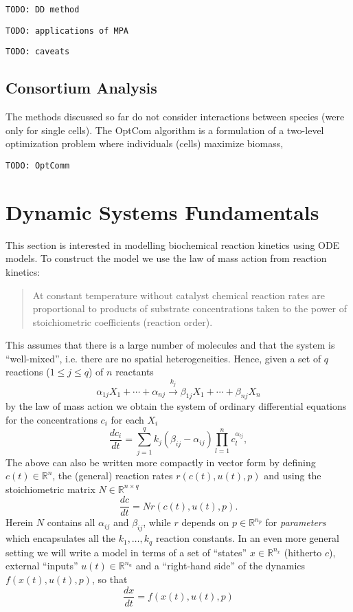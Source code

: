\documentclass[a4paper]{article}
\newcommand{\todo}[1]{\texttt{TODO: #1}}
\theoremstyle{plain}
\theoremstyle{definition}
\theoremstyle{remark}
\begin{document}
\todo{DD method}

\todo{applications of MPA}

\todo{caveats}

\subsection{Consortium Analysis}

The methods discussed so far do not consider interactions between species
(were only for single cells). The OptCom algorithm is a formulation of a
two-level optimization problem where individuals (cells) maximize biomass, 

\todo{OptComm}


\section{Dynamic Systems Fundamentals}

This section is interested in modelling biochemical reaction kinetics using
ODE models. To construct the model we use the law of mass action from reaction
kinetics:
\begin{quote}
  At constant temperature without catalyst chemical reaction rates are
  proportional to products of substrate concentrations taken to the power of
  stoichiometric coefficients (reaction order).
\end{quote}
This assumes that there is a large number of molecules and that the system is
``well-mixed'', i.e. there are no spatial heterogeneities. Hence, given a
set of $q$ reactions ($1 \leq j \leq q$) of $n$ reactants
\[
  \alpha_{1j} X_1 + \cdots + \alpha_{nj}
  \stackrel{k_j}{\longrightarrow}
  \beta_{1j} X_1 + \cdots + \beta_{nj} X_n
\]
by the law of mass action we obtain the system of ordinary differential
equations for the concentrations $c_i$ for each $X_i$
\[
  \frac{dc_i}{dt} = \sum_{j=1}^q k_j (\beta_{ij} - \alpha_{ij})
    \prod_{l=1}^n c_l^{\alpha_{lj}},
\]
The above can also be written more compactly in vector form by defining $c(t)
\in \mathbb{R}^{n}$, the (general) reaction rates $r(c(t), u(t), p)$ and using
the stoichiometric matrix $N \in \mathbb{R}^{n \times q}$
\[
  \frac{dc}{dt} = N r(c(t), u(t), p).
\]
Herein $N$ contains all $\alpha_{ij}$ and $\beta_{ij}$, while $r$ depends on
$p \in \mathbb{R}^{n_p}$ for \emph{parameters} which encapsulates all the
$k_1, \ldots, k_q$ reaction constants. In an even more general setting we will
write a model in terms of a set of ``states'' $x \in \mathbb{R}^{n_x}$
(hitherto $c$), external ``inputs'' $u(t) \in \mathbb{R}^{n_u}$ and a
``right-hand side'' of the dynamics $f(x(t), u(t), p)$, so that
\[
  \frac{dx}{dt} = f(x(t), u(t), p)
\]
\end{document}
